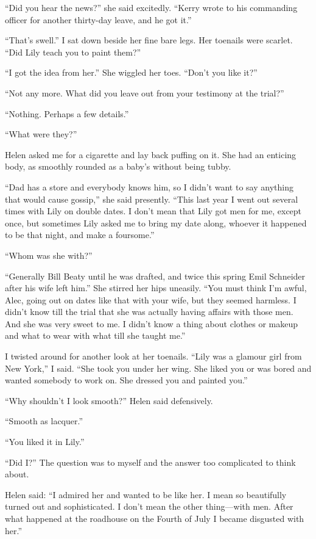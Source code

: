 \documentclass{novel}
\begin{document}
{“Did you hear the news?” she said excitedly. “Kerry wrote to his commanding officer for another thirty-day leave, and he got it.”

“That’s swell.” I sat down beside her fine bare legs. Her toenails were scarlet. “Did Lily teach you to paint them?”

“I got the idea from her.” She wiggled her toes. “Don’t you like it?”

“Not any more. What did you leave out from your testimony at the trial?”

“Nothing. Perhaps a few details.”

“What were they?”

Helen asked me for a cigarette and lay back puffing on it. She had an enticing body, as smoothly rounded as a baby’s without being tubby.

“Dad has a store and everybody knows him, so I didn’t want to say anything that would cause gossip,” she said presently. “This last year I went out several times with Lily on double dates. I don’t mean that Lily got men for me, except once, but sometimes Lily asked me to bring my date along, whoever it happened to be that night, and make a foursome.”

“Whom was she with?”

“Generally Bill Beaty until he was drafted, and twice this spring Emil Schneider after his wife left him.” She stirred her hips uneasily. “You must think I’m awful, Alec, going out on dates like that with your wife, but they seemed harmless. I didn’t know till the trial that she was actually having affairs with those men. And she was very sweet to me. I didn’t know a thing about clothes or makeup and what to wear with what till she taught me.”

I twisted around for another look at her toenails. “Lily was a glamour girl from New York,” I said. “She took you under her wing. She liked you or was bored and wanted somebody to work on. She dressed you and painted you.”

“Why shouldn’t I look smooth?” Helen said defensively.

“Smooth as lacquer.”

“You liked it in Lily.”

“Did I?” The question was to myself and the answer too complicated to think about.

Helen said: “I admired her and wanted to be like her. I mean so beautifully turned out and sophisticated. I don’t mean the other thing—with men. After what happened at the roadhouse on the Fourth of July I became disgusted with her.”

}
\end{document}
